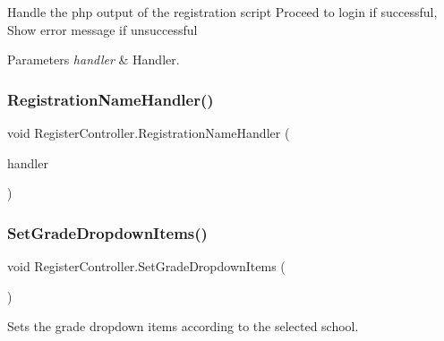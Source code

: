 Handle the php output of the registration script Proceed to login if successful, Show error message if unsuccessful 


\begin{DoxyParams}{Parameters}
{\em handler} & Handler.\\
\hline
\end{DoxyParams}
\mbox{\label{classRegisterController_a6134936cccf67ed5356ebe5951ca50a8}} 
\subsubsection{\texorpdfstring{Registration\+Name\+Handler()}{RegistrationNameHandler()}}
{\footnotesize\ttfamily void Register\+Controller.\+Registration\+Name\+Handler (\begin{DoxyParamCaption}\item[{\hyperlink{classPhpOutputHandler}{Php\+Output\+Handler}}]{handler }\end{DoxyParamCaption})\hspace{0.3cm}{\ttfamily [inline]}}

\mbox{\label{classRegisterController_a28f855c65269510bd5dac66aa39a1f9e}} 
\subsubsection{\texorpdfstring{Set\+Grade\+Dropdown\+Items()}{SetGradeDropdownItems()}}
{\footnotesize\ttfamily void Register\+Controller.\+Set\+Grade\+Dropdown\+Items (\begin{DoxyParamCaption}{ }\end{DoxyParamCaption})\hspace{0.3cm}{\ttfamily [inline]}}



Sets the grade dropdown items according to the selected school. 

\mbox{\label{classRegisterController_a02902491d57c7eb064bbcec47b4ff1a1}} 
